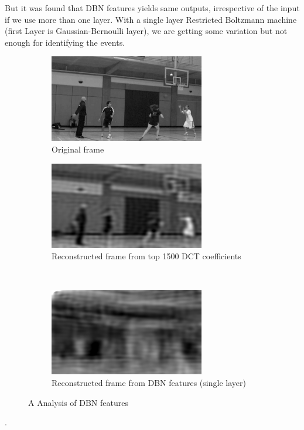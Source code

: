 But it was found that DBN features yields same outputs, irrespective of the input if we use more than one layer.  With a single layer Restricted Boltzmann machine (first Layer is Gaussian-Bernoulli layer), we are getting some variation but not enough for identifying the events.\\


\begin{figure}
        \centering
        \begin{subfigure}[b]{\textwidth}
        			\centering
                \includegraphics[scale=1]{./imgs/Original.png}
                \caption{Original frame}
                \label{fig:original}
        \end{subfigure}%
        
        \begin{subfigure}[b]{0.45\textwidth}
        		\centering
        		\includegraphics[scale=1]{./imgs/DCT.png}
        		\caption{Reconstructed frame from top 1500 DCT coefficients}
        		\label{fig:dct}
        \end{subfigure}
        ~%
        \begin{subfigure}[b]{0.45\textwidth}
        			\centering
                \includegraphics[scale=1]{./imgs/DBN.png}
                \caption{Reconstructed frame from DBN features (single layer)}
                \label{fig:dbn}
        \end{subfigure}
        \caption{ A Analysis of DBN features}
        \label{fig:dct+dbn}
\end{figure}.

